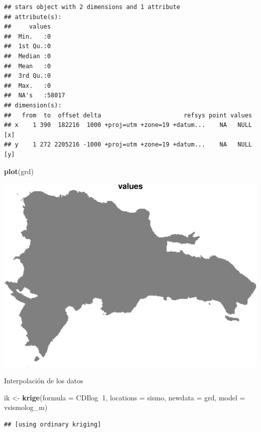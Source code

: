 \documentclass[11pt,]{article}
\newenvironment{Shaded}{\begin{snugshade}}{\end{snugshade}}
\newcommand{\KeywordTok}[1]{\textcolor[rgb]{0.13,0.29,0.53}{\textbf{#1}}}
\newcommand{\DataTypeTok}[1]{\textcolor[rgb]{0.13,0.29,0.53}{#1}}
\newcommand{\DecValTok}[1]{\textcolor[rgb]{0.00,0.00,0.81}{#1}}
\newcommand{\StringTok}[1]{\textcolor[rgb]{0.31,0.60,0.02}{#1}}
\newcommand{\OperatorTok}[1]{\textcolor[rgb]{0.81,0.36,0.00}{\textbf{#1}}}
\newcommand{\NormalTok}[1]{#1}
\begin{document}
\begin{verbatim}
## stars object with 2 dimensions and 1 attribute
## attribute(s):
##     values      
##  Min.   :0      
##  1st Qu.:0      
##  Median :0      
##  Mean   :0      
##  3rd Qu.:0      
##  Max.   :0      
##  NA's   :58017  
## dimension(s):
##   from  to  offset delta                       refsys point values    
## x    1 390  182216  1000 +proj=utm +zone=19 +datum...    NA   NULL [x]
## y    1 272 2205216 -1000 +proj=utm +zone=19 +datum...    NA   NULL [y]
\end{verbatim}

\begin{Shaded}
\begin{Highlighting}[]
\KeywordTok{plot}\NormalTok{(grd)}
\end{Highlighting}
\end{Shaded}

\includegraphics{proyecto_files/figure-latex/unnamed-chunk-27-1.pdf}

Interpolación de los datos

\begin{Shaded}
\begin{Highlighting}[]
\NormalTok{ik <-}\StringTok{ }\KeywordTok{krige}\NormalTok{(}\DataTypeTok{formula =}\NormalTok{ CDIlog}\OperatorTok{~}\DecValTok{1}\NormalTok{, }\DataTypeTok{locations =}\NormalTok{ sismo, }\DataTypeTok{newdata =}\NormalTok{ grd, }\DataTypeTok{model =}\NormalTok{ vsismolog_m)}
\end{Highlighting}
\end{Shaded}

\begin{verbatim}
## [using ordinary kriging]
\end{verbatim}
\end{document}
